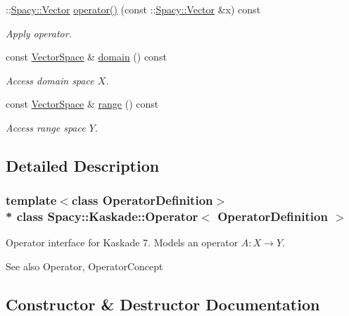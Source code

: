 \begin{DoxyCompactItemize}
\+::\hyperlink{classSpacy_1_1Vector}{Spacy\+::\+Vector} \hyperlink{classSpacy_1_1Kaskade_1_1Operator_a598da59e26cce77e41619ba554db5eb4}{operator()} (const \+::\hyperlink{classSpacy_1_1Vector}{Spacy\+::\+Vector} \&x) const 
\begin{DoxyCompactList}\small\item\em Apply operator. \end{DoxyCompactList}\item 
const \hyperlink{classSpacy_1_1VectorSpace}{Vector\+Space} \& \hyperlink{classSpacy_1_1OperatorBase_a2588f9b3e0188820c4c494e63293dc6f}{domain} () const \hypertarget{classSpacy_1_1OperatorBase_a2588f9b3e0188820c4c494e63293dc6f}{}\label{classSpacy_1_1OperatorBase_a2588f9b3e0188820c4c494e63293dc6f}

\begin{DoxyCompactList}\small\item\em Access domain space $X$. \end{DoxyCompactList}\item 
const \hyperlink{classSpacy_1_1VectorSpace}{Vector\+Space} \& \hyperlink{classSpacy_1_1OperatorBase_ab19d3b7a6f290b1079248f1e567e53d6}{range} () const \hypertarget{classSpacy_1_1OperatorBase_ab19d3b7a6f290b1079248f1e567e53d6}{}\label{classSpacy_1_1OperatorBase_ab19d3b7a6f290b1079248f1e567e53d6}

\begin{DoxyCompactList}\small\item\em Access range space $Y$. \end{DoxyCompactList}\end{DoxyCompactItemize}


\subsection{Detailed Description}
\subsubsection*{template$<$class Operator\+Definition$>$\\*
class Spacy\+::\+Kaskade\+::\+Operator$<$ Operator\+Definition $>$}

Operator interface for Kaskade 7. Models an operator $A:X\rightarrow Y$. 

\begin{DoxySeeAlso}{See also}
Operator, Operator\+Concept 
\end{DoxySeeAlso}


\subsection{Constructor \& Destructor Documentation}
